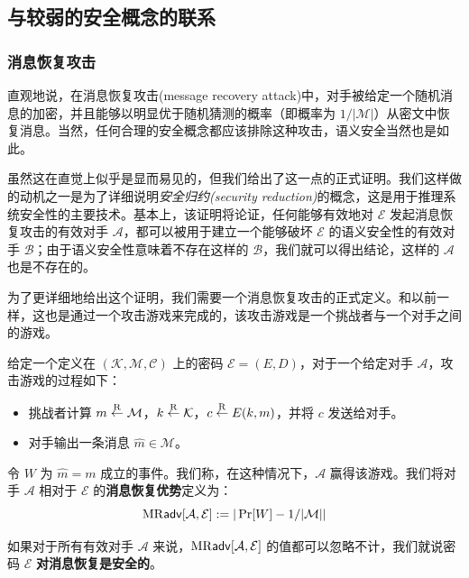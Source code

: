 \subsection{与较弱的安全概念的联系}\label{subsec:2-2-3}

\subsubsection{消息恢复攻击}\label{subsubsec:2-2-3-1}

直观地说，在消息恢复攻击(message recovery attack)中，对手被给定一个随机消息的加密，并且能够以明显优于随机猜测的概率（即概率为 ${1}/{|\mathcal{M}|}$）从密文中恢复消息。当然，任何合理的安全概念都应该排除这种攻击，语义安全当然也是如此。

虽然这在直觉上似乎是显而易见的，但我们给出了这一点的正式证明。我们这样做的动机之一是为了详细说明\emph{安全归约(security reduction)}的概念，这是用于推理系统安全性的主要技术。基本上，该证明将论证，任何能够有效地对 $\mathcal{E}$ 发起消息恢复攻击的有效对手 $\mathcal{A}$，都可以被用于建立一个能够破坏 $\mathcal{E}$ 的语义安全性的有效对手 $\mathcal{B}$；由于语义安全性意味着不存在这样的 $\mathcal{B}$，我们就可以得出结论，这样的 $\mathcal{A}$也是不存在的。

为了更详细地给出这个证明，我们需要一个消息恢复攻击的正式定义。和以前一样，这也是通过一个攻击游戏来完成的，该攻击游戏是一个挑战者与一个对手之间的游戏。

\begin{game}[消息恢复]\label{game:2-2}
给定一个定义在 $(\mathcal{K},\mathcal{M},\mathcal{C})$ 上的密码 $\mathcal{E}=(E,D)$，对于一个给定对手 $\mathcal{A}$，攻击游戏的过程如下：
\begin{itemize}
	\item 挑战者计算 $m\overset{\rm R}\leftarrow\mathcal{M}$，$k\overset{\rm R}\leftarrow\mathcal{K}$，$c\overset{\rm R}\leftarrow E(k,m)$，并将 $c$ 发送给对手。
	\item 对手输出一条消息 $\hat m\in\mathcal{M}$。
\end{itemize}
令 $W$ 为 $\hat m=m$ 成立的事件。我们称，在这种情况下，$\mathcal{A}$ 赢得该游戏。我们将对手 $\mathcal{A}$ 相对于 $\mathcal{E}$ 的\textbf{消息恢复优势}定义为：
$$
{\rm MR\mathsf{adv}}[\mathcal{A},\mathcal{E}]:=|\Pr[W] -{1}/{|\mathcal{M}|}|
$$
\end{game}

\begin{definition}[针对消息恢复的安全性]
如果对于所有有效对手 $\mathcal{A}$ 来说，${\rm MR\mathsf{adv}}[\mathcal{A},\mathcal{E}]$ 的值都可以忽略不计，我们就说密码 $\mathcal{E}$ \textbf{对消息恢复是安全的}。
\end{definition}

